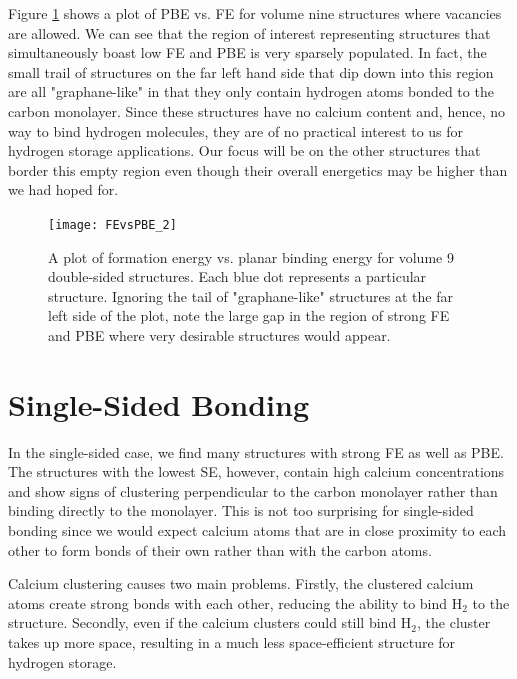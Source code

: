 \documentclass[oneside, noacknowlegments]{BYUPhys}
\begin{document}
Figure \ref{fig:FEvsPBE} shows a plot of PBE vs. FE for volume nine 
structures where vacancies are allowed. We can see that the region 
of interest representing structures that simultaneously boast low 
FE and PBE is very sparsely populated. In fact, the small trail of 
structures on the far left hand side that dip down into this region 
are all "graphane-like" in that they only contain hydrogen atoms 
bonded to the carbon monolayer. Since these structures have no 
calcium content and, hence, no way to bind hydrogen molecules, they 
are of no practical interest to us for hydrogen storage 
applications. Our focus will be on the other structures that border 
this empty region even though their overall energetics may be 
higher than we had hoped for.

\begin{figure}
	\centering
	\begin{minipage}{0.65\textwidth}
		\centering
		\texttt{[image: FEvsPBE\_2]}
	\end{minipage}
	\caption{A plot of formation energy vs. planar binding energy 
		for volume 9 double-sided structures. Each blue dot 
		represents a particular structure. Ignoring the tail of 
		"graphane-like" structures at the far left side of the 
		plot, note the large gap in the region of strong FE and PBE 
		where very desirable structures would appear.}
	\label{fig:FEvsPBE}
\end{figure}

\section{Single-Sided Bonding}

In the single-sided case, we find many structures with strong FE as well as PBE.  The structures with the lowest SE, however, contain high calcium concentrations and show signs of clustering perpendicular to the carbon monolayer rather than binding directly to the monolayer. This is not too surprising for single-sided bonding since we would expect calcium atoms that are in close proximity to each other to form bonds of their own rather than with the carbon atoms. 

Calcium clustering causes two main problems. Firstly, the clustered calcium atoms create strong bonds with each other, reducing the ability to bind $\mathrm{H_{2}}$ to the structure. Secondly, even if the calcium clusters could still bind $\mathrm{H_{2}}$, the cluster takes up more space, resulting in a much less space-efficient structure for hydrogen storage.
\end{document}
